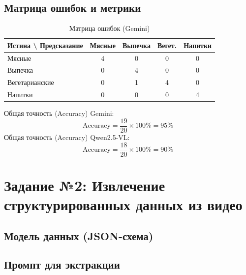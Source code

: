 \documentclass[oneside,a4paper,14pt]{extarticle} %
\begin{document}
		\subsection{Матрица ошибок и метрики}
		\begin{table}[H]
			\centering
			\caption{Матрица ошибок (Gemini)}
			\begin{tabular}{|l|c|c|c|c|}
				\hline
				\textbf{Истина \textbackslash{} Предсказание} & \textbf{Мясные} & \textbf{Выпечка} & \textbf{Вегет.} & \textbf{Напитки} \\ \hline
				Мясные & 4 & 0 & 0 & 0 \\ \hline
				Выпечка & 0 & 4 & 0 & 0 \\ \hline
				Вегетарианские & 0 & 1 & 4 & 0 \\ \hline
				Напитки & 0 & 0 & 0 & 4 \\ \hline
			\end{tabular}
		\end{table}
		\noindent
		Общая точность (Accuracy) Gemini:
		\begin{equation}
			\text{Accuracy} = \frac{19}{20} \times 100\% = 95\%
		\end{equation}
		Общая точность (Accuracy) Qwen2.5-VL:
		\begin{equation}
			\text{Accuracy} = \frac{18}{20} \times 100\% = 90\%
		\end{equation}
		
		\newpage
		\section{Задание №2: Извлечение структурированных данных из видео}
		\subsection{Модель данных (JSON-схема)}
		
		
		\subsection{Промпт для экстракции}
		
		
\end{document}
